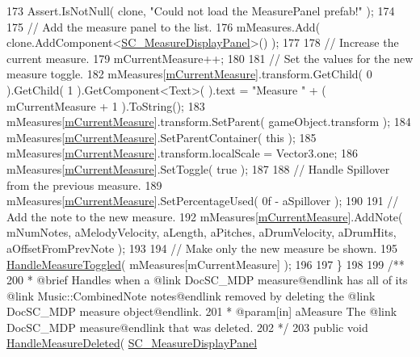 \begin{DoxyCodeInclude}
173         Assert.IsNotNull( clone, \textcolor{stringliteral}{"Could not load the MeasurePanel prefab!"} );
174 
175         \textcolor{comment}{// Add the measure panel to the list.}
176         mMeasures.Add( clone.AddComponent<\hyperlink{class_s_c___measure_display_panel}{SC\_MeasureDisplayPanel}>() );
177 
178         \textcolor{comment}{// Increase the current measure.}
179         mCurrentMeasure++;
180 
181         \textcolor{comment}{// Set the values for the new measure toggle.}
182         mMeasures[\hyperlink{group___s_c___n_d_c_priv_var_ga28ce2bf8358c9f686b5b9e362aa96dff}{mCurrentMeasure}].transform.GetChild( 0 ).GetChild( 1 ).GetComponent<Text>(
      ).text = \textcolor{stringliteral}{"Measure "} + ( mCurrentMeasure + 1 ).ToString();
183         mMeasures[\hyperlink{group___s_c___n_d_c_priv_var_ga28ce2bf8358c9f686b5b9e362aa96dff}{mCurrentMeasure}].transform.SetParent( gameObject.transform );
184         mMeasures[\hyperlink{group___s_c___n_d_c_priv_var_ga28ce2bf8358c9f686b5b9e362aa96dff}{mCurrentMeasure}].SetParentContainer( \textcolor{keyword}{this} );
185         mMeasures[\hyperlink{group___s_c___n_d_c_priv_var_ga28ce2bf8358c9f686b5b9e362aa96dff}{mCurrentMeasure}].transform.localScale = Vector3.one;
186         mMeasures[\hyperlink{group___s_c___n_d_c_priv_var_ga28ce2bf8358c9f686b5b9e362aa96dff}{mCurrentMeasure}].SetToggle( \textcolor{keyword}{true} );
187 
188         \textcolor{comment}{// Handle Spillover from the previous measure.}
189         mMeasures[\hyperlink{group___s_c___n_d_c_priv_var_ga28ce2bf8358c9f686b5b9e362aa96dff}{mCurrentMeasure}].SetPercentageUsed( 0f - aSpillover );
190 
191         \textcolor{comment}{// Add the note to the new measure.}
192         mMeasures[\hyperlink{group___s_c___n_d_c_priv_var_ga28ce2bf8358c9f686b5b9e362aa96dff}{mCurrentMeasure}].AddNote( mNumNotes, aMelodyVelocity, aLength, aPitches, 
      aDrumVelocity, aDrumHits, aOffsetFromPrevNote );
193 
194         \textcolor{comment}{// Make only the new measure be shown.}
195         \hyperlink{group___s_c___n_d_c_handlers_ga458d57203645be514d3626211044b584}{HandleMeasureToggled}( mMeasures[mCurrentMeasure] );
196 
197     \}
198 \textcolor{comment}{}
199 \textcolor{comment}{    /**}
200 \textcolor{comment}{     * @brief Handles when a @link DocSC\_MDP measure@endlink has all of its @link Music::CombinedNote
       notes@endlink removed by deleting the @link DocSC\_MDP measure object@endlink.}
201 \textcolor{comment}{     * @param[in] aMeasure The @link DocSC\_MDP measure@endlink that was deleted.}
202 \textcolor{comment}{    */}
203     \textcolor{keyword}{public} \textcolor{keywordtype}{void} \hyperlink{group___s_c___n_d_c_handlers_ga40ffb2c779af43930924348c265c9e09}{HandleMeasureDeleted}( \hyperlink{class_s_c___measure_display_panel}{SC\_MeasureDisplayPanel} 

\end{DoxyCodeInclude}
